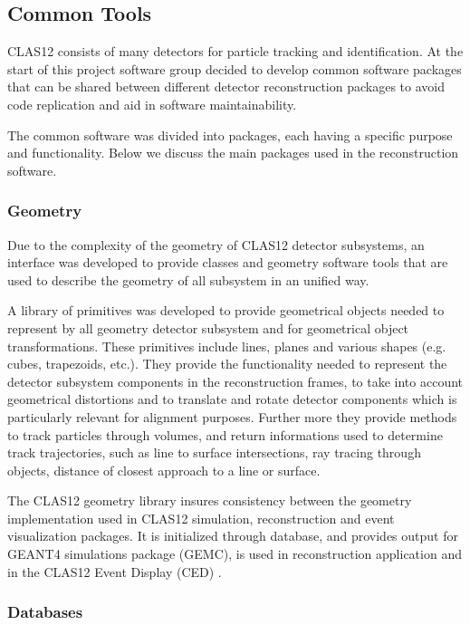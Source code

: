 \documentclass{elsart}
\begin{document}
\subsection{Common Tools}
\label{common-tools}

CLAS12 consists of many detectors for particle tracking and identification. At the start of this project software
group decided to develop common software packages that can be shared between different detector reconstruction
packages to avoid code replication and aid in software maintainability.

The common software was divided into packages, each having a specific purpose and functionality. Below we discuss
the main packages used in the reconstruction software.

\subsubsection{Geometry}

Due to the complexity of the geometry of CLAS12 detector subsystems, an interface was developed 
to provide classes and geometry software tools that are used to describe the geometry of all subsystem in an unified way.

A library of primitives was developed to provide geometrical objects needed to represent by all geometry detector subsystem
and for geometrical object transformations.  These primitives include lines, planes and various shapes (e.g. 
cubes, trapezoids, etc.).  They provide the functionality needed
to represent the detector subsystem components in the reconstruction frames, to take into account geometrical distortions
and to translate and rotate detector components which is particularly relevant for alignment purposes. 
Further more they provide methods to track particles through volumes, and return informations used to determine 
track trajectories,
such as line to surface intersections, ray tracing through objects, distance of closest approach to a line or surface.

The CLAS12 geometry library insures consistency between the geometry implementation used in CLAS12 simulation, reconstruction and 
event visualization packages. It is initialized through database, and provides output for GEANT4 simulations package
(GEMC), is used in reconstruction application and in the CLAS12 Event Display (CED) .

\subsubsection{Databases}
\end{document}
